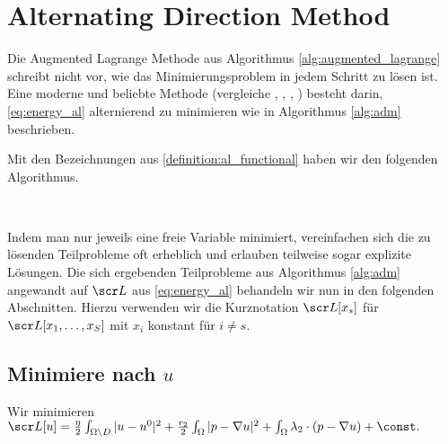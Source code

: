 \documentclass{mythesis}
\begin{document}
\section{Alternating Direction Method} \label{section:adm}

Die Augmented Lagrange Methode aus Algorithmus \ref{alg:augmented_lagrange} schreibt nicht vor, wie das Minimierungsproblem in jedem Schritt zu lösen ist.
Eine moderne und beliebte Methode (vergleiche \cite{brito2010fast}, \cite{yashtini2015alternating}, \cite{hahn2011fast}, \cite{duan2013fast}) besteht darin, \eqref{eq:energy_al} alternierend zu minimieren wie in Algorithmus \ref{alg:adm} beschrieben.

\begin{algorithm} \label{alg:adm}
    Mit den Bezeichnungen aus \ref{definition:al_functional} haben wir den folgenden Algorithmus.

    \begin{samepage}
    \\
    \begin{algorithmic}
	    \EndFor
	\EndFor
    \end{algorithmic}
    \end{samepage}
\end{algorithm}

Indem man nur jeweils eine freie Variable minimiert, vereinfachen sich die zu lösenden Teilprobleme oft erheblich und erlauben teilweise sogar explizite Lösungen.
Die sich ergebenden Teilprobleme aus Algorithmus \ref{alg:adm} angewandt auf $\scr L$ aus \eqref{eq:energy_al} behandeln wir nun in den folgenden Abschnitten.
Hierzu verwenden wir die Kurznotation $\scr L[x_s]$ für $\scr L[x_1, \dotsc, x_S]$ mit $x_i$ konstant für $i \neq s$.


\subsection*{Minimiere nach $u$}

Wir minimieren
\begin{math}
    \scr L[u] =
    \frac{\eta}{2} \int_{\Omega \setminus D} |u - u^0|^2
    + \frac{r_2}{2} \int_\Omega |p - \nabla u|^2
    + \int_\Omega \lambda_2 \cdot (p - \nabla u)
    + \const.
\end{math}
\end{document}
